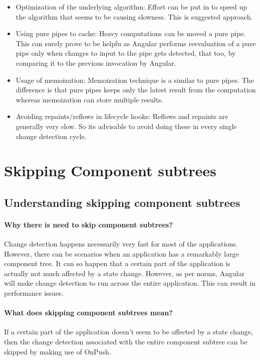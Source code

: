 \documentclass{report}
\begin{document}
\begin{itemize}
	\item{Optimization of the underlying algorithm: Effort can be put in to speed up the algorithm that seems to be causing slowness. This is suggested approach.}
	\item{Using pure pipes to cache: Heavy computations can be moved a pure pipe. This can surely prove to be helpfu as Angular performs reevaluation of a pure pipe only when changes to input to the pipe gets detected, that too, by comparing it to the previous invocation by Angular. }
	\item{Usage of memoization: Memoization technique is a similar to pure pipes. The difference is that pure pipes keeps only the latest result from the computation whereas memoization can store multiple results.}
	\item{Avoiding repaints/reflows in lifecycle hooks: Reflows and repaints are generally very slow. So its advisable to avoid doing these in every single change detection cycle.}
\end{itemize}

\chapter{Skipping Component subtrees}
\section{Understanding skipping component subtrees}
\subsubsection*{Why there is need to skip component subtrees?}
Change detection happens necessarily very fast for most of the applications. However, there can be scenarios when an application has a remarkably large component tree. It can so happen that a certain part of the application is actually not much affected by a state change. However, as per norms, Angular will make change detection to run across the entire application. This can result in performance issues.
\subsubsection*{What does skipping component subtrees mean?}
If a certain part of the application doesn’t seem to be affected by a state change, then the change detection associated with the entire component subtree can be skipped by making use of OnPush.
\end{document}
